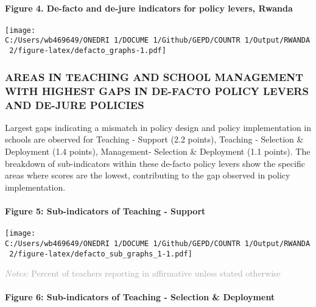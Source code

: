 \documentclass[twocolumn]{article}
\let\oldparagraph\paragraph
\renewcommand{\paragraph}[1]{\oldparagraph{#1}\mbox{}}
\begin{document}
\hypertarget{figure-4.-de-facto-and-de-jure-indicators-for-policy-levers-rwanda}{%
\paragraph{Figure 4. De-facto and de-jure indicators for policy levers,
Rwanda}\label{figure-4.-de-facto-and-de-jure-indicators-for-policy-levers-rwanda}}

\texttt{[image: C:/Users/wb469649/ONEDRI~1/DOCUME~1/Github/GEPD/COUNTR~1/Output/RWANDA~2/figure-latex/defacto\_graphs-1.pdf]}

\hypertarget{areas-in-teaching-and-school-management-with-highest-gaps-in-de-facto-policy-levers-and-de-jure-policies}{%
\subsubsection{\texorpdfstring{\textbf{AREAS IN TEACHING AND SCHOOL
MANAGEMENT WITH HIGHEST GAPS IN DE-FACTO POLICY LEVERS AND DE-JURE
POLICIES}}{AREAS IN TEACHING AND SCHOOL MANAGEMENT WITH HIGHEST GAPS IN DE-FACTO POLICY LEVERS AND DE-JURE POLICIES}}\label{areas-in-teaching-and-school-management-with-highest-gaps-in-de-facto-policy-levers-and-de-jure-policies}}

Largest gaps indicating a mismatch in policy design and policy
implementation in schools are observed for Teaching - Support (2.2
points), Teaching - Selection \& Deployment (1.4 points), Management-
Selection \& Deployment (1.1 points). The breakdown of sub-indicators
within these de-facto policy levers show the specific areas where scores
are the lowest, contributing to the gap observed in policy
implementation. \vfill\null

\hypertarget{figure-5-sub-indicators-of-teaching---support}{%
\paragraph{Figure 5: Sub-indicators of Teaching -
Support}\label{figure-5-sub-indicators-of-teaching---support}}

\texttt{[image: C:/Users/wb469649/ONEDRI~1/DOCUME~1/Github/GEPD/COUNTR~1/Output/RWANDA~2/figure-latex/defacto\_sub\_graphs\_1-1.pdf]}

{\scriptsize
    \textcolor{darkgray}{\textit{Notes:} Percent of teachers reporting in affirmative unless stated otherwise}
  }

\hypertarget{figure-6-sub-indicators-of-teaching---selection-deployment}{%
\paragraph{Figure 6: Sub-indicators of Teaching - Selection \&
Deployment}\label{figure-6-sub-indicators-of-teaching---selection-deployment}}
\end{document}
